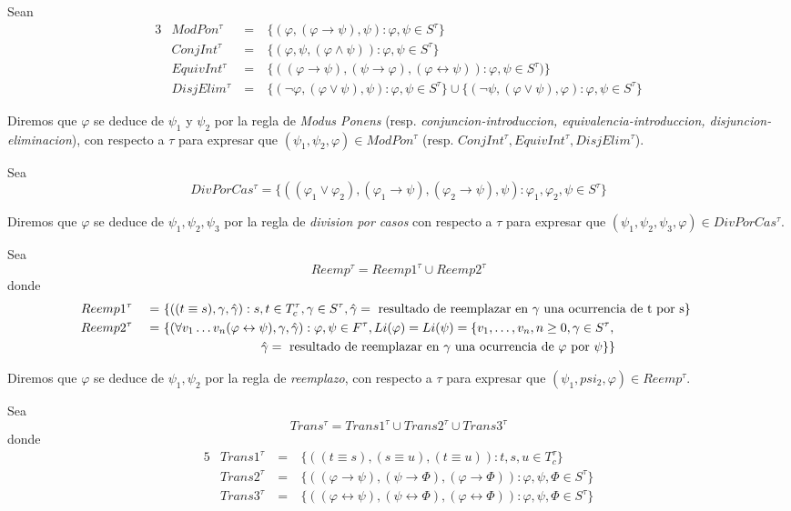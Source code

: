 \begin{definition}
  Sean
  \begin{alignat*}{3}
    &ModPon^\tau &\ =&\ \{(\varphi,(\varphi\rightarrow\psi),\psi):\varphi,\psi\in S^\tau\}\\
    &ConjInt^\tau &\ =&\ \{(\varphi,\psi,(\varphi\land\psi)):\varphi,\psi\in S^\tau\}\\
    &EquivInt^\tau &\ =&\ \{((\varphi\rightarrow\psi),(\psi\rightarrow\varphi),(\varphi\leftrightarrow\psi)):\varphi,\psi\in S^\tau)\}\\
    &DisjElim^\tau &\ =&\ \{(\neg\varphi,(\varphi\lor\psi),\psi):\varphi,\psi\in S^\tau\}\cup\{(\neg\psi,(\varphi\lor\psi),\varphi):\varphi,\psi\in S^\tau\}
  \end{alignat*}

  Diremos que $\varphi$ se deduce de $\psi_1$ y $\psi_2$ por la regla de \emph{Modus Ponens} (resp.
  \emph{conjuncion-introduccion, equivalencia-introduccion, disjuncion-eliminacion}), con respecto a $\tau$ para
  expresar que $(\psi_1,\psi_2,\varphi) \in ModPon^\tau$ (resp. $ConjInt^\tau,EquivInt^\tau,DisjElim^\tau$).

  Sea
  $$
  DivPorCas^\tau = \{((\varphi_1\lor\varphi_2),(\varphi_1\rightarrow\psi),(\varphi_2\rightarrow\psi),\psi):\varphi_1,\varphi_2,\psi\in S^\tau\}
  $$

  Diremos que $\varphi$ se deduce de $\psi_1,\psi_2,\psi_3$ por la regla de \emph{division por casos} con respecto a $\tau$
  para expresar que $(\psi_1,\psi_2,\psi_3,\varphi) \in DivPorCas^\tau$.

  Sea
  $$
  Reemp^\tau = Reemp1^\tau \cup Reemp2^\tau
  $$
  donde 
  \begin{alignat*}{5}
    &Reemp1^\tau &\ =&\ \{((t\equiv s), \gamma,\hat\gamma):s,t\in T_c^\tau, \gamma\in S^\tau, \hat\gamma = \text{ resultado de reemplazar en $\gamma$ una ocurrencia de t por s}\}\\
    &Reemp2^\tau &\ =&\ \{(\forall v_1\dots v_n(\varphi\leftrightarrow\psi),\gamma,\hat\gamma):\varphi,\psi\in F^\tau, Li(\varphi)=Li(\psi)=\{v_{1}, \dots, v_{n}, n\geq 0, \gamma \in S^\tau,&&\\
    & &&\qquad\qquad\qquad\qquad \hat\gamma = \text{ resultado de reemplazar en $\gamma$ una ocurrencia de $\varphi$ por $\psi$}\}\}
  \end{alignat*}

  Diremos que $\varphi$ se deduce de $\psi_1, \psi_2$ por la regla de \emph{reemplazo}, con respecto a $\tau$  para expresar que $(\psi_1,psi_2,\varphi)\in Reemp^\tau$.

  Sea
  $$
  Trans^\tau = Trans1^\tau \cup Trans2^\tau \cup Trans3^\tau
  $$
  donde 
  \begin{alignat*}{5}
    &Trans1^\tau &\ =&\ \{((t\equiv s),(s\equiv u),(t\equiv u)):t,s,u\in T_c^\tau\}\\
    &Trans2^\tau &\ =&\ \{((\varphi\rightarrow\psi),(\psi\rightarrow\varPhi),(\varphi\rightarrow\varPhi)):\varphi,\psi,\varPhi\in S^\tau\}\\
    &Trans3^\tau &\ =&\ \{((\varphi\leftrightarrow\psi),(\psi\leftrightarrow\varPhi),(\varphi\leftrightarrow\varPhi)):\varphi,\psi,\varPhi\in S^\tau\}
  \end{alignat*}


\end{definition}
